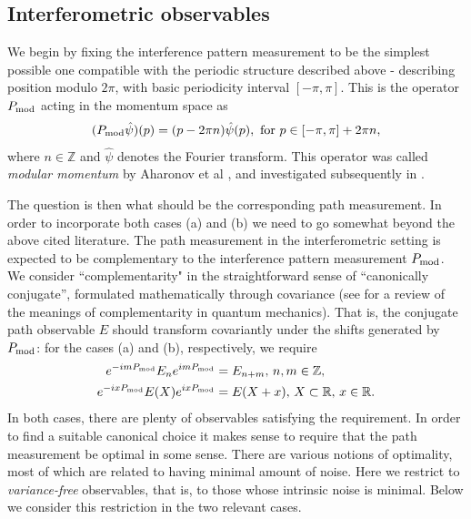 \subsection{Interferometric observables}

We begin by fixing the interference pattern measurement to be the simplest possible one compatible with the periodic structure described above - describing position modulo $2\pi$, with basic periodicity interval $[-\pi,\pi]$. This is the operator $P_{\mathrm{mod}}$ acting in the momentum space as
\begin{align}
(P_{\mathrm{mod}}\hat\psi)(p) = (p-2\pi n)\hat\psi(p), \text{ for } p\in [-\pi,\pi] +2\pi n,
\end{align}
where $n\in \mathbb Z$ and $\hat \psi$ denotes the Fourier transform. This operator was called \emph{modular momentum} by Aharonov et al \cite{aharonov-modular-variables}, and investigated subsequently in \cite{PhysRevA.90.022115}.

The question is then what should be the corresponding path measurement. In order to incorporate both cases (a) and (b) we need to go somewhat beyond the above cited literature. The path measurement in the interferometric setting is expected to be complementary to the interference pattern measurement $P_{\mathrm{mod}}$. We consider ``complementarity" in the straightforward sense of ``canonically conjugate'', formulated mathematically through covariance (see \cite{Kiukas2019} for a review of the meanings of complementarity in quantum mechanics). That is, the conjugate path observable $E$ should transform covariantly under the shifts generated by $P_{\mathrm{mod}}$: for the cases (a) and (b), respectively, we require
\begin{align}
e^{-im P_{\mathrm{mod}}}E_ne^{im P_{\mathrm{mod}}} &= E_{n+m}, \,n,m\in \mathbb Z, \label{covA}\\
e^{-ix P_{\mathrm{mod}}}E(X)e^{ix P_{\mathrm{mod}}} &= E(X+x), \,X\subset \mathbb R,\,x\in \mathbb R. \label{covB}
\end{align}
In both cases, there are plenty of observables satisfying the requirement. In order to find a suitable canonical choice it makes sense to require that the path measurement be optimal in some sense. There are various notions of optimality, most of which are related to having minimal amount of noise. Here we restrict to \emph{variance-free} observables, that is, to those whose intrinsic noise is minimal. Below we consider this restriction in the two relevant cases.

